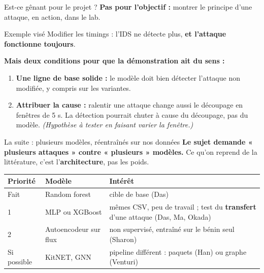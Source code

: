 \documentclass[aspectratio=169,11pt,xcolor=table]{beamer}
\newcommand{\espacement}{\setlength{\itemsep}{.7em}}
\begin{document}
\begin{frame}{Est-ce gênant pour le projet ?}
  \textbf{Pas pour l'objectif :} montrer le principe d'une attaque, en action, dans le lab.
  \vspace{.3em}
  \begin{block}{Exemple visé}
    Modifier les timings : l'IDS ne détecte plus, \textbf{et l'attaque fonctionne toujours}.
  \end{block}
  \vspace{.5em}
  \textbf{Mais deux conditions pour que la démonstration ait du sens :}
  \begin{enumerate}\espacement
    \item \textbf{Une ligne de base solide :} le modèle doit bien détecter l'attaque non modifiée, y compris sur les variantes.
    \item \textbf{Attribuer la cause :} ralentir une attaque change aussi le découpage en fenêtres de 5 s. La détection pourrait chuter à cause du découpage, pas du modèle. \textit{(Hypothèse à tester en faisant varier la fenêtre.)}
  \end{enumerate}
\end{frame}

\begin{frame}{La suite : plusieurs modèles, réentraînés sur nos données}
  \textbf{Le sujet demande « plusieurs attaques » contre « plusieurs » modèles.} Ce qu'on reprend de la littérature, c'est l'\textbf{architecture}, pas les poids.
  \vspace{.6em}

  \small
  \renewcommand{\arraystretch}{1.25}
  \begin{tabularx}{\linewidth}{@{}p{.12\linewidth}p{.26\linewidth}X@{}}
    \toprule
    \textbf{Priorité} & \textbf{Modèle} & \textbf{Intérêt} \\
    \midrule
    Fait & Random forest & cible de base (Das) \\
    1 & MLP ou XGBoost & mêmes CSV, peu de travail ; test du \textbf{transfert} d'une attaque (Das, Ma, Okada) \\
    2 & Autoencodeur sur flux & non supervisé, entraîné sur le bénin seul (Sharon) \\
    Si possible & KitNET, GNN & pipeline différent : paquets (Han) ou graphe (Venturi) \\
    \bottomrule
  \end{tabularx}
\end{frame}
\end{document}
